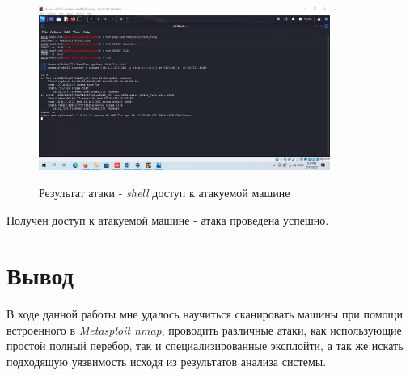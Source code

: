 \documentclass[a4paper]{article}
\begin{document}
  \begin{figure}[H]
    \centering
    \includegraphics[width=0.85\textwidth]{04_0095}
    \label{img:94}
    \caption{Результат атаки - \textit{shell} доступ к атакуемой машине}
  \end{figure}

  Получен доступ к атакуемой машине - атака проведена успешно.

  \section{Вывод}

  В ходе данной работы мне удалось научиться сканировать машины при помощи
  встроенного в \textit{Metasploit nmap}, проводить различные атаки, как
  использующие простой полный перебор, так и специализированные эксплойти,
  а так же искать подходящую уязвимость исходя из результатов анализа системы.
\end{document}
